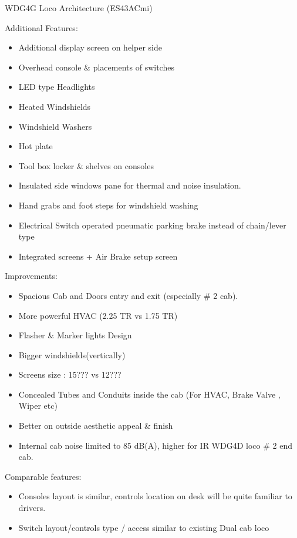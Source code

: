 \documentclass[
  ignorenonframetext,
]{beamer}
\providecommand{\tightlist}{%
  \setlength{\itemsep}{0pt}\setlength{\parskip}{0pt}}
\begin{document}
\begin{frame}{WDG4G Loco Architecture (ES43ACmi)}
\begin{block}{Additional Features:}
\protect\hypertarget{additional-features}{}
\begin{itemize}[<+->]
\tightlist
\item
  Additional display screen on helper side
\item
  Overhead console \& placements of switches
\item
  LED type Headlights
\item
  Heated Windshields
\item
  Windshield Washers
\item
  Hot plate
\item
  Tool box locker \& shelves on consoles
\item
  Insulated side windows pane for thermal and noise insulation.
\item
  Hand grabs and foot steps for windshield washing
\item
  Electrical Switch operated pneumatic parking brake instead of
  chain/lever type
\item
  Integrated screens + Air Brake setup screen
\end{itemize}
\end{block}
\end{frame}

\begin{frame}{Improvements:}
\protect\hypertarget{improvements}{}
\begin{itemize}[<+->]
\tightlist
\item
  Spacious Cab and Doors entry and exit (especially \# 2 cab).
\item
  More powerful HVAC (2.25 TR vs 1.75 TR)
\item
  Flasher \& Marker lights Design
\item
  Bigger windshields(vertically)
\item
  Screens size : 15??? vs 12???
\item
  Concealed Tubes and Conduits inside the cab (For HVAC, Brake Valve ,
  Wiper etc)
\item
  Better on outside aesthetic appeal \& finish
\item
  Internal cab noise limited to 85 dB(A), higher for IR WDG4D loco \# 2
  end cab.
\end{itemize}
\end{frame}

\begin{frame}{Comparable features:}
\protect\hypertarget{comparable-features}{}
\begin{itemize}[<+->]
\tightlist
\item
  Consoles layout is similar, controls location on desk will be quite
  familiar to drivers.
\item
  Switch layout/controls type / access similar to existing Dual cab loco
\end{itemize}
\end{frame}
\end{document}
